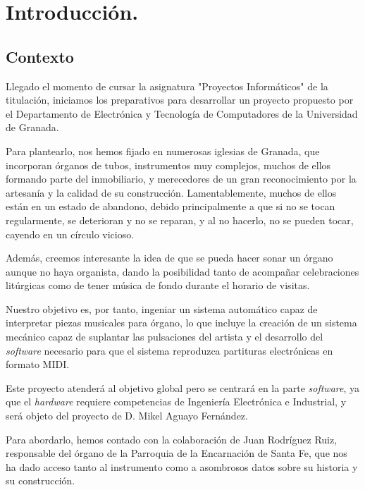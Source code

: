 \chapter{Introducción.}
\label{cap:capitulo_1}

\section{Contexto}

Llegado el momento de cursar la asignatura "Proyectos Informáticos" de la titulación, iniciamos los preparativos para desarrollar un proyecto propuesto por el Departamento de Electrónica y Tecnología de Computadores de la Universidad de Granada.

Para plantearlo, nos hemos fijado en numerosas iglesias de Granada, que incorporan órganos de tubos, instrumentos muy complejos, muchos de ellos formando parte del inmobiliario, y merecedores de un gran reconocimiento por la artesanía y la calidad de su construcción. Lamentablemente, muchos de ellos están en un estado de abandono, debido principalmente a que si no se tocan regularmente, se deterioran y no se reparan, y al no hacerlo, no se pueden tocar, cayendo en un círculo vicioso.

Además, creemos interesante la idea de que se pueda hacer sonar un órgano aunque no haya organista, dando la posibilidad tanto de acompañar celebraciones litúrgicas como de tener música de fondo durante el horario de visitas.

Nuestro objetivo es, por tanto, ingeniar un sistema automático capaz de interpretar piezas musicales para órgano, lo que incluye la creación de un sistema mecánico capaz de suplantar las pulsaciones del artista y el desarrollo del \textit{software} necesario para que el sistema reproduzca partituras electrónicas en formato MIDI.

\newpage

Este proyecto atenderá al objetivo global pero se centrará en la parte \textit{software}, ya que el \textit{hardware} requiere competencias de Ingeniería Electrónica e Industrial, y será objeto del proyecto de D. Mikel Aguayo Fernández.

Para abordarlo, hemos contado con la colaboración de Juan Rodríguez Ruiz, responsable del órgano de la Parroquia de la Encarnación de Santa Fe, que nos ha dado acceso tanto al instrumento como a asombrosos datos sobre su historia y su construcción.

\smallskip

